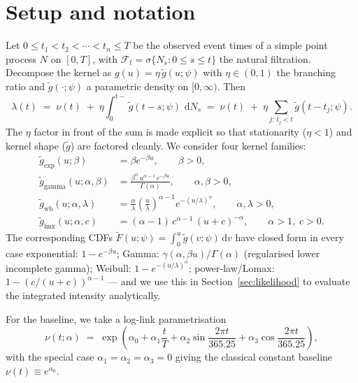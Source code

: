 \documentclass[article,shortnames,nojss]{jss}
\newcommand{\rmd}{\,\mathrm{d}}
\newcommand{\1}{\mathbbm{1}}
\theoremstyle{plain}
\theoremstyle{definition}
\begin{document}
\section{Setup and notation}\label{sec:setup}

Let $0 \le t_1 < t_2 < \cdots < t_n \le T$ be the observed event
times of a simple point process $N$ on $[0,T]$, with $\mathcal{F}_t =
\sigma\{N_s : 0 \le s \le t\}$ the natural filtration.
Decompose the kernel as $g(u) = \eta\,\tilde g(u; \psi)$ with
$\eta \in (0,1)$ the branching ratio and $\tilde g(\cdot;\psi)$
a parametric density on $[0,\infty)$.  Then
\begin{equation}\label{eq:lambda-of-t}
  \lambda(t) \;=\; \nu(t)
  \;+\; \eta\int_{0}^{t-}\! \tilde g(t-s;\psi)\,\rmd N_s
  \;=\; \nu(t) \;+\; \eta\sum_{j:\,t_j<t} \tilde g(t-t_j;\psi).
\end{equation}
The $\eta$ factor in front of the sum is made explicit so that
stationarity ($\eta<1$) and kernel shape ($\tilde g$) are
factored cleanly.  We consider four kernel families:
\begin{align}
  \tilde g_{\text{exp}}(u;\beta) &= \beta e^{-\beta u}, \qquad \beta>0, \label{eq:exp-kernel}\\
  \tilde g_{\text{gamma}}(u;\alpha,\beta) &= \frac{\beta^{\alpha}\,u^{\alpha-1}\,e^{-\beta u}}{\Gamma(\alpha)},
    \qquad \alpha,\beta>0, \label{eq:gamma-kernel}\\
  \tilde g_{\text{wb}}(u;\alpha,\lambda) &= \frac{\alpha}{\lambda}
    \!\left(\!\frac{u}{\lambda}\!\right)^{\!\alpha-1}\!
    e^{-(u/\lambda)^{\alpha}}, \qquad \alpha,\lambda>0, \label{eq:weibull-kernel}\\
  \tilde g_{\text{lmx}}(u;\alpha,c) &= (\alpha-1)\,c^{\alpha-1}\,(u+c)^{-\alpha},
    \qquad \alpha>1,\; c>0. \label{eq:lomax-kernel}
\end{align}
The corresponding CDFs $\tilde F(u;\psi) = \int_0^u \tilde
g(v;\psi)\rmd v$ have closed form in every case
\textemdash exponential: $1-e^{-\beta u}$;
Gamma: $\gamma(\alpha,\beta u)/\Gamma(\alpha)$ (regularised lower incomplete gamma);
Weibull: $1-e^{-(u/\lambda)^\alpha}$;
power-law/Lomax: $1-(c/(u+c))^{\alpha-1}$ --- and we use this in
Section~\ref{sec:likelihood} to evaluate the integrated intensity
analytically.

For the baseline, we take a log-link parametrisation
\begin{equation}\label{eq:baseline}
  \nu(t;\alpha) \;=\; \exp\!\left(\alpha_0
      + \alpha_1\frac{t}{T}
      + \alpha_2 \sin\!\frac{2\pi t}{365.25}
      + \alpha_3 \cos\!\frac{2\pi t}{365.25}\right),
\end{equation}
with the special case $\alpha_1=\alpha_2=\alpha_3=0$ giving the
classical constant baseline $\nu(t) \equiv e^{\alpha_0}$.
\end{document}
